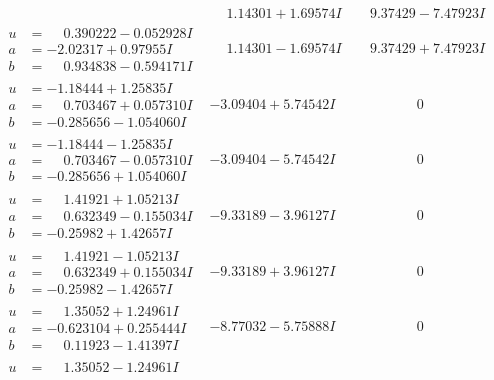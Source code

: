 \documentclass[1p]{elsarticle_modified}
\theoremstyle{definition}
\begin{document}
$$\begin{array}{c|c|c}
 & \phantom{-}1.14301 + 1.69574 I & \phantom{-}9.37429 - 7.47923 I \\ \hline\begin{aligned}
u &= \phantom{-}0.390222 - 0.052928 I \\
a &= -2.02317 + 0.97955 I \\
b &= \phantom{-}0.934838 - 0.594171 I\end{aligned}
 & \phantom{-}1.14301 - 1.69574 I & \phantom{-}9.37429 + 7.47923 I \\ \hline\begin{aligned}
u &= -1.18444 + 1.25835 I \\
a &= \phantom{-}0.703467 + 0.057310 I \\
b &= -0.285656 - 1.054060 I\end{aligned}
 & -3.09404 + 5.74542 I & \phantom{-0.000000 } 0 \\ \hline\begin{aligned}
u &= -1.18444 - 1.25835 I \\
a &= \phantom{-}0.703467 - 0.057310 I \\
b &= -0.285656 + 1.054060 I\end{aligned}
 & -3.09404 - 5.74542 I & \phantom{-0.000000 } 0 \\ \hline\begin{aligned}
u &= \phantom{-}1.41921 + 1.05213 I \\
a &= \phantom{-}0.632349 - 0.155034 I \\
b &= -0.25982 + 1.42657 I\end{aligned}
 & -9.33189 - 3.96127 I & \phantom{-0.000000 } 0 \\ \hline\begin{aligned}
u &= \phantom{-}1.41921 - 1.05213 I \\
a &= \phantom{-}0.632349 + 0.155034 I \\
b &= -0.25982 - 1.42657 I\end{aligned}
 & -9.33189 + 3.96127 I & \phantom{-0.000000 } 0 \\ \hline\begin{aligned}
u &= \phantom{-}1.35052 + 1.24961 I \\
a &= -0.623104 + 0.255444 I \\
b &= \phantom{-}0.11923 - 1.41397 I\end{aligned}
 & -8.77032 - 5.75888 I & \phantom{-0.000000 } 0 \\ \hline\begin{aligned}
u &= \phantom{-}1.35052 - 1.24961 I \\

\end{aligned}
\end{array}$$
\end{document}
